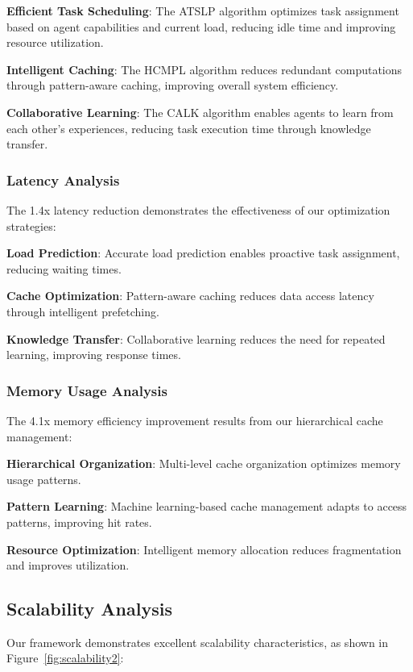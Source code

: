\documentclass[conference]{IEEEtran}
\begin{document}
\textbf{Efficient Task Scheduling}: The ATSLP algorithm optimizes task assignment based on agent capabilities and current load, reducing idle time and improving resource utilization.

\textbf{Intelligent Caching}: The HCMPL algorithm reduces redundant computations through pattern-aware caching, improving overall system efficiency.

\textbf{Collaborative Learning}: The CALK algorithm enables agents to learn from each other's experiences, reducing task execution time through knowledge transfer.

\subsubsection{Latency Analysis}

The 1.4x latency reduction demonstrates the effectiveness of our optimization strategies:

\textbf{Load Prediction}: Accurate load prediction enables proactive task assignment, reducing waiting times.

\textbf{Cache Optimization}: Pattern-aware caching reduces data access latency through intelligent prefetching.

\textbf{Knowledge Transfer}: Collaborative learning reduces the need for repeated learning, improving response times.

\subsubsection{Memory Usage Analysis}

The 4.1x memory efficiency improvement results from our hierarchical cache management:

\textbf{Hierarchical Organization}: Multi-level cache organization optimizes memory usage patterns.

\textbf{Pattern Learning}: Machine learning-based cache management adapts to access patterns, improving hit rates.

\textbf{Resource Optimization}: Intelligent memory allocation reduces fragmentation and improves utilization.

\subsection{Scalability Analysis}

Our framework demonstrates excellent scalability characteristics, as shown in Figure~\ref{fig:scalability2}:
\end{document}
